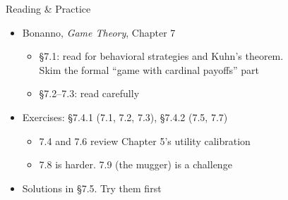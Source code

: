 \begin{frame}{Reading \& Practice}
\begin{itemize}
    \item Bonanno, \textit{Game Theory}, Chapter 7
    \begin{itemize}
        \item \S7.1: read for behavioral strategies and Kuhn's theorem.\\
        Skim the formal ``game with cardinal payoffs'' part
        \item \S7.2--7.3: read carefully
    \end{itemize}
    \item Exercises: \S7.4.1 (7.1, 7.2, 7.3), \S7.4.2 (7.5, 7.7)
    \begin{itemize}
        \item 7.4 and 7.6 review Chapter 5's utility calibration
        \item 7.8 is harder. 7.9 (the mugger) is a challenge
    \end{itemize}
    \item Solutions in \S7.5. Try them first
\end{itemize}
\vfill
\end{frame}


